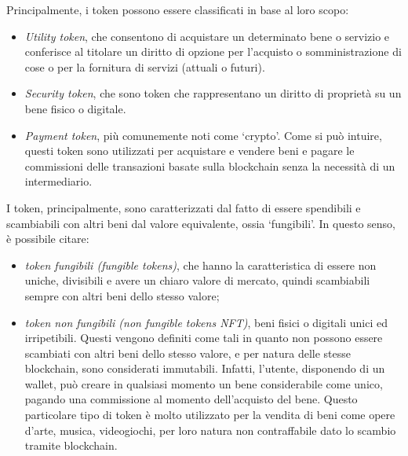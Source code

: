Principalmente, i token possono essere classificati in base al loro scopo:
\begin{itemize}
    \item \textit{Utility token}, che consentono di acquistare un determinato bene o servizio e conferisce al titolare un diritto di opzione per l'acquisto o somministrazione di cose o per la fornitura di servizi (attuali o futuri). 
    \item \textit{Security token}, che sono token che rappresentano un diritto di proprietà su un bene fisico o digitale.
    \item \textit{Payment token}, più comunemente noti come `crypto'. Come si può intuire, questi token sono utilizzati per acquistare e vendere beni e pagare le commissioni delle transazioni basate sulla blockchain senza la necessità di un intermediario.
\end{itemize}

I token, principalmente, sono caratterizzati dal fatto di essere spendibili e scambiabili con altri beni dal valore equivalente, ossia `fungibili'.
In questo senso, è possibile citare:
\begin{itemize}
    \item \textit{token fungibili (fungible tokens)}, che hanno la caratteristica di essere non uniche, divisibili e avere un chiaro valore di mercato, quindi scambiabili sempre con altri beni dello stesso valore;
    \item \textit{token non fungibili (non fungible tokens  NFT)}, beni fisici o digitali unici ed irripetibili. Questi vengono definiti come tali in quanto non possono essere scambiati con altri beni dello stesso valore,
    e per natura delle stesse blockchain, sono considerati immutabili. Infatti, l'utente, disponendo di un wallet, può creare in qualsiasi momento un bene considerabile come unico, pagando una commissione al momento dell'acquisto del bene.
    Questo particolare tipo di token è molto utilizzato per la vendita di beni come opere d'arte, musica, videogiochi, per loro natura non contraffabile dato lo scambio tramite blockchain.
\end{itemize}

